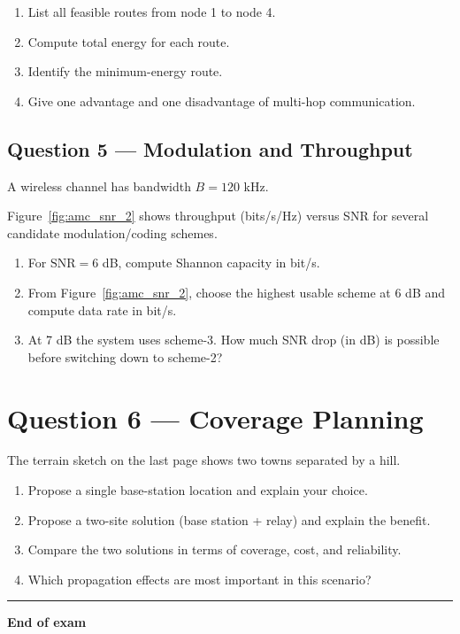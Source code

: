 \documentclass[11pt,a4paper]{article}
\begin{document}
\begin{enumerate}[label=\alph*)]
    \item List all feasible routes from node 1 to node 4.
    \item Compute total energy for each route.
    \item Identify the minimum-energy route.
    \item Give one advantage and one disadvantage of multi-hop communication.
\end{enumerate}

\subsection*{Question 5 --- Modulation and Throughput}
A wireless channel has bandwidth $B = 120$ kHz.

Figure~\ref{fig:amc_snr_2} shows throughput (bits/s/Hz) versus SNR for several candidate modulation/coding schemes.

\FloatBarrier

\begin{enumerate}[label=\alph*)]
    \item For $\mathrm{SNR}=6$ dB, compute Shannon capacity in bit/s.
    \item From Figure~\ref{fig:amc_snr_2}, choose the highest usable scheme at 6 dB and compute data rate in bit/s.
    \item At 7 dB the system uses scheme-3. How much SNR drop (in dB) is possible before switching down to scheme-2?
\end{enumerate}

\section*{Question 6 --- Coverage Planning}
The terrain sketch on the last page shows two towns separated by a hill.

\begin{enumerate}[label=\alph*)]
\item Propose a single base-station location and explain your choice.
\item Propose a two-site solution (base station + relay) and explain the benefit.
\item Compare the two solutions in terms of coverage, cost, and reliability.
\item Which propagation effects are most important in this scenario?
\end{enumerate}

\vspace{0.6cm}
\hrule
\vspace{0.3cm}
\textbf{End of exam}


\clearpage
\label{LastPage}
\end{document}
